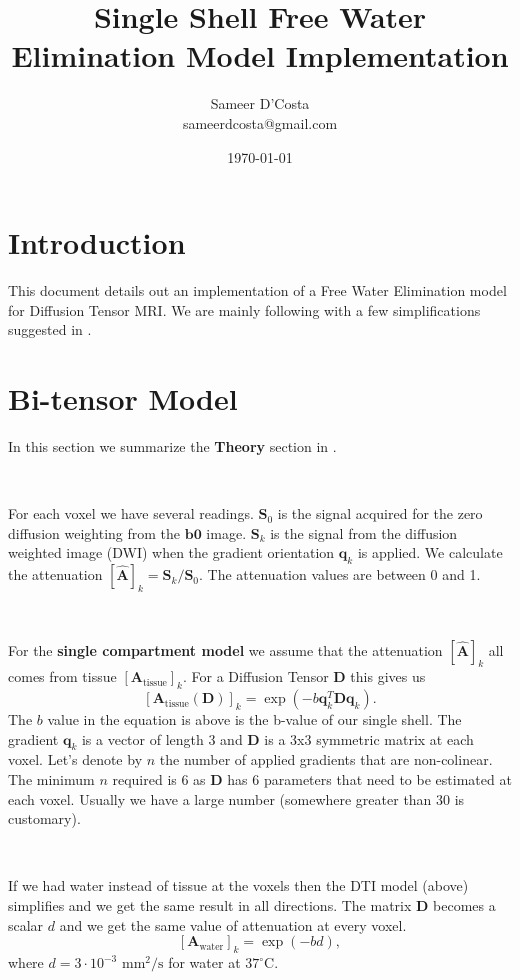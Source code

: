 \documentclass[12pt]{article}
\title{Single Shell Free Water Elimination Model Implementation
}
\author{
  Sameer D'Costa \\
    sameerdcosta@gmail.com
}
\date{\today}
\newcommand{\vect}[1]{\mathbf{#1}}
\newcommand{\Ahat}{\hat{\vect{A}}}
\newcommand{\Atissue}{\vect{A}_{\text{tissue}}}
\newcommand{\Awater}{\vect{A}_{\text{water}}}
\begin{document}
\maketitle

\section{Introduction}
This document details out an implementation of a Free Water Elimination model
for Diffusion Tensor MRI. We are mainly following \cite{Pasternak2009} with a
few simplifications suggested in \cite{Pasternak2014}.

\section{Bi-tensor Model}
In this section we summarize the \textbf{Theory} section in
\cite{Pasternak2009}. 

\ 

\noindent
For each voxel we have several readings. $\vect{S}_0$ is the signal acquired
for the zero diffusion weighting from the $\vect{b0}$ image. $\vect{S}_k$ is
the signal from the diffusion weighted image (DWI) when the gradient
orientation $\vect{q}_k$ is applied. We calculate the attenuation
$[\hat{\vect{A}}]_k = \vect{S}_k / \vect{S}_0$. The attenuation values are
between 0 and 1. 

\ 

\noindent
For the \textbf{single compartment model} we assume that the attenuation
$[\Ahat]_k$ all comes from tissue $[\Atissue]_k$. For a Diffusion Tensor
$\vect{D}$ this gives us 
$$[\Atissue(\vect{D})]_k = \exp(-b \vect{q}_k^T\vect{D}\vect{q}_k).$$
The $b$ value in the equation is above is the b-value of our single shell. The
gradient $\vect{q}_k$ is a vector of length 3 and $\vect{D}$ is a 3x3 symmetric
matrix at each voxel. Let's denote by $n$ the number of applied gradients that
are non-colinear.  The minimum $n$ required is 6 as $\vect{D}$ has 6 parameters
that need to be estimated at each voxel. Usually we have a large number
(somewhere greater than 30 is customary).


\ 

\noindent
If we had water instead of tissue at the voxels then the DTI model (above)
simplifies and we get the same result in all directions. The matrix $\vect{D}$
becomes a scalar $d$ and we get the same value of attenuation at every voxel.
$$[\Awater]_k = \exp(-bd),$$
where $d = 3 \cdot 10^{-3}$ $\text{mm}^2/\text{s}$ for water at $37^\circ$C. 
\end{document}
